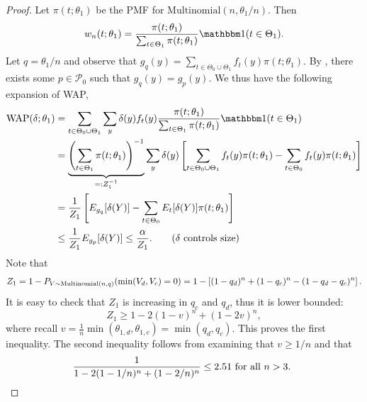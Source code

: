 \documentclass[12pt,reqno]{amsart}
\theoremstyle{theorem}
\theoremstyle{definition}
\newcommand{\0}{\mathbf{0}}
\newcommand{\1}{\mathbf{1}}
\begin{document}
\propnowap*
\begin{proof}
    Let $\pi(t; \theta_1)$ be the PMF for $\mathrm{Multinomial}(n, \theta_1/n)$. Then \[
        w_n(t;\theta_1) = \frac{\pi(t;\theta_1)}{\sum_{t\in\Theta_1} \pi(t;\theta_1)} \one
        (t\in\Theta_1).
    \]
    Let $q=\theta_1/n$ and observe that $g_{q}(y) = \sum_{t \in \Theta_0 \cup \Theta_1} f_t(y) \pi(t;\theta_1)$. By
    , there exists some $p\in \mathcal P_0$ such that $g_{q}(y) = g_p
    (y)$. We thus have the following expansion of WAP, \begin{align*}
    \mathrm{WAP}(\delta;\theta_1) &= \sum_{t \in \Theta_0 \cup \Theta_1} \sum_y \delta(y) f_t(y)\frac{\pi(t;\theta_1)}{\sum_{t\in\Theta_1} \pi(t;\theta_1)} \one
        (t\in\Theta_1) \\
        &= \underbrace{\pr{\sum_{t\in\Theta_1} \pi(t;\theta_1)}^{-1}}_{=: Z_1^{-1}}
        \sum_ {y} \delta (y) \bk{\sum_ {t \in
        \Theta_0
        \cup \Theta_1} f_t(y) \pi(t; \theta_1) - \sum_{t\in \Theta_0} f_t(y)\pi(t;\theta_1)}
        \\
        &= \frac{1}{Z_1} \bk{E_{g_{q}}[\delta(Y)] - \sum_{t\in\Theta_0} E_t[\delta(Y)] \pi
        (t;
        \theta_1)} \\
        &\le \frac{1}{Z_1} E_{g_p}[\delta(Y)] \le \frac{\alpha}{Z_1}. \tag{$\delta$ controls size}
    \end{align*}
    Note that \[
        Z_1 = 1-P_{V \sim \mathrm{Multinomial}(n, q)} (\min(V_d, V_c) = 0) = 1 -
        \left[{
            (1-q_d)^n + (1-q_c)^n - (1-q_d - q_c)^n
        }\right].
    \]
    It is easy to check that $Z_1$ is increasing in $q_c$ and $q_d$, thus it is lower
    bounded: \[
        Z_1 \ge 1-2(1-v)^n + (1-2v)^n,
    \]
    where recall $v = \tfrac{1}{n} \min(\theta_{1,d},\theta_{1,c}) = \min(q_d,q_c)$. This proves the first inequality. The second inequality follows from examining that
    $v \ge 1/n$ and that \[
    \frac{1}{1-2(1-1/n)^n + (1-2/n)^n} \le 2.51 \text{ for all $n > 3$. } \qedhere
    \]
\end{proof}
\end{document}

